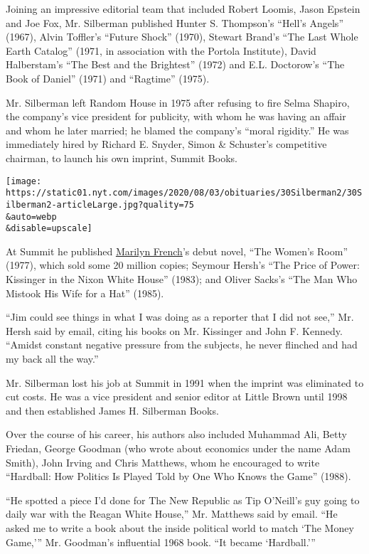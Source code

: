 Joining an impressive editorial team that included Robert Loomis, Jason
Epstein and Joe Fox, Mr. Silberman published Hunter S. Thompson's
``Hell's Angels'' (1967), Alvin Toffler's ``Future Shock'' (1970),
Stewart Brand's ``The Last Whole Earth Catalog'' (1971, in association
with the Portola Institute), David Halberstam's ``The Best and the
Brightest'' (1972) and E.L. Doctorow's ``The Book of Daniel'' (1971) and
``Ragtime'' (1975).

Mr. Silberman left Random House in 1975 after refusing to fire Selma
Shapiro, the company's vice president for publicity, with whom he was
having an affair and whom he later married; he blamed the company's
``moral rigidity.'' He was immediately hired by Richard E. Snyder, Simon
\& Schuster's competitive chairman, to launch his own imprint, Summit
Books.

\texttt{[image: https://static01.nyt.com/images/2020/08/03/obituaries/30Silberman2/30Silberman2-articleLarge.jpg?quality=75\\\&auto=webp\\\&disable=upscale]}

At Summit he published
\href{https://www.nytimes.com/2009/05/04/arts/04french.html}{Marilyn
French}'s debut novel, ``The Women's Room'' (1977), which sold some 20
million copies; Seymour Hersh's ``The Price of Power: Kissinger in the
Nixon White House'' (1983); and Oliver Sacks's ``The Man Who Mistook His
Wife for a Hat'' (1985).

``Jim could see things in what I was doing as a reporter that I did not
see,'' Mr. Hersh said by email, citing his books on Mr. Kissinger and
John F. Kennedy. ``Amidst constant negative pressure from the subjects,
he never flinched and had my back all the way.''

Mr. Silberman lost his job at Summit in 1991 when the imprint was
eliminated to cut costs. He was a vice president and senior editor at
Little Brown until 1998 and then established James H. Silberman Books.

Over the course of his career, his authors also included Muhammad Ali,
Betty Friedan, George Goodman (who wrote about economics under the name
Adam Smith), John Irving and Chris Matthews, whom he encouraged to write
``Hardball: How Politics Is Played Told by One Who Knows the Game''
(1988).

``He spotted a piece I'd done for The New Republic as Tip O'Neill's guy
going to daily war with the Reagan White House,'' Mr. Matthews said by
email. ``He asked me to write a book about the inside political world to
match `The Money Game,''' Mr. Goodman's influential 1968 book. ``It
became `Hardball.'''

